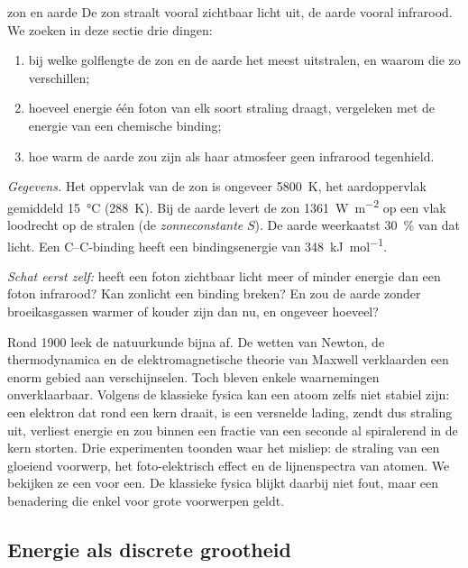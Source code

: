 \begin{casus}{zon en aarde}
De zon straalt vooral zichtbaar licht uit, de aarde vooral infrarood. We zoeken in deze sectie drie dingen:
\begin{enumerate}
\item bij welke golflengte de zon en de aarde het meest uitstralen, en waarom die zo verschillen;
\item hoeveel energie één foton van elk soort straling draagt, vergeleken met de energie van een chemische binding;
\item hoe warm de aarde zou zijn als haar atmosfeer geen infrarood tegenhield.
\end{enumerate}
\emph{Gegevens.} Het oppervlak van de zon is ongeveer \SI{5800}{\kelvin}, het aardoppervlak gemiddeld \SI{15}{\celsius} (\SI{288}{\kelvin}). Bij de aarde levert de zon \SI{1361}{\watt\per\metre\squared} op een vlak loodrecht op de stralen (de \emph{zonneconstante} $S$). De aarde weerkaatst \SI{30}{\percent} van dat licht. Een C--C-binding heeft een bindingsenergie van \SI{348}{\kilo\joule\per\mole}.

\emph{Schat eerst zelf:} heeft een foton zichtbaar licht meer of minder energie dan een foton infrarood? Kan zonlicht een binding breken? En zou de aarde zonder broeikasgassen warmer of kouder zijn dan nu, en ongeveer hoeveel?
\end{casus}

Rond 1900 leek de natuurkunde bijna af. De wetten van Newton, de thermodynamica en de elektromagnetische theorie van Maxwell verklaarden een enorm gebied aan verschijnselen. Toch bleven enkele waarnemingen onverklaarbaar. Volgens de klassieke fysica kan een atoom zelfs niet stabiel zijn: een elektron dat rond een kern draait, is een versnelde lading, zendt dus straling uit, verliest energie en zou binnen een fractie van een seconde al spiralerend in de kern storten. Drie experimenten toonden waar het misliep: de straling van een gloeiend voorwerp, het foto-elektrisch effect en de lijnenspectra van atomen. We bekijken ze een voor een. De klassieke fysica blijkt daarbij niet fout, maar een benadering die enkel voor grote voorwerpen geldt.

\subsection{Energie als discrete grootheid}

